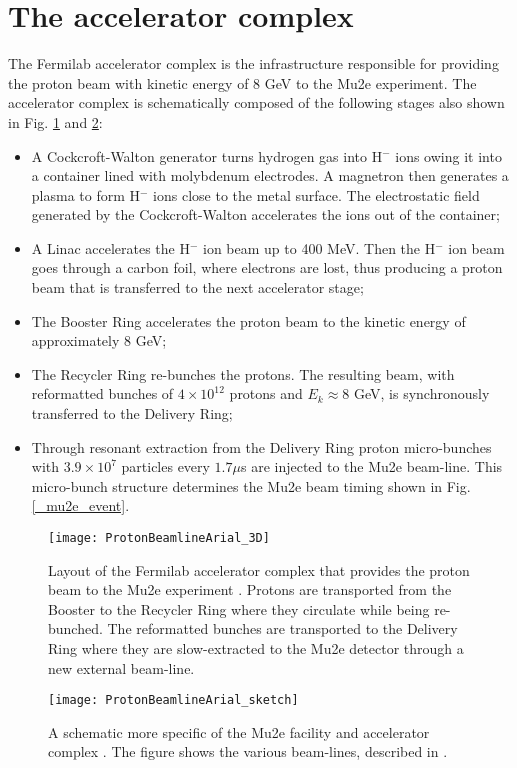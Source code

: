 \documentclass[12pt,a4paper,openright, oneside, titlepage]{book} %
\begin{document}
\section{The accelerator complex}
The Fermilab accelerator complex is the infrastructure responsible for providing the proton beam with kinetic energy of 8 GeV to the Mu2e experiment.
The accelerator complex is schematically composed of the following stages also shown in Fig. \ref{_ProtonBeamlineArial} and \ref{_ProtonBeamlineArial_sketch}:
\begin{itemize}
\item A Cockcroft-Walton generator turns hydrogen gas
into H$^-$ ions owing it into a container lined with molybdenum electrodes. 
A magnetron then generates a plasma to form H$^-$ ions close to the metal surface. 
The electrostatic field generated by the Cockcroft-Walton accelerates the ions out of the container;
\item A Linac accelerates the H$^-$ ion beam up to 400 MeV. 
Then the H$^-$  ion beam goes through a carbon foil, 
where electrons are lost, thus producing a proton beam that is transferred to the next accelerator stage;
\item The Booster Ring accelerates the proton beam to the kinetic energy of approximately 8 GeV;
\item The Recycler Ring re-bunches the protons. 
The resulting beam, with reformatted bunches of $4\times10^{12}$ protons and $E_k\approx8$ GeV,
is synchronously transferred to the Delivery Ring;
\item Through resonant extraction from the Delivery Ring proton micro-bunches
with $3.9\times10^7$ particles every $1.7 \mu$s are injected to the Mu2e beam-line. 
This  micro-bunch structure determines the Mu2e beam timing shown in Fig.  \ref{_mu2e_event}. 
\end{itemize}

\begin{figure}[h!]
\centering
\texttt{[image: ProtonBeamlineArial\_3D]}
\caption{Layout of the Fermilab accelerator complex that provides the proton beam to the Mu2e experiment \cite{FNAL}. 
Protons are transported from the Booster to the Recycler Ring where they circulate while being re-bunched. 
The reformatted bunches are transported to the Delivery Ring where they are slow-extracted to the Mu2e detector through a new external beam-line.}
\label{_ProtonBeamlineArial}
\end{figure}

\begin{figure}[h!]
\centering
\texttt{[image: ProtonBeamlineArial\_sketch]}
\caption{A schematic more specific of the Mu2e facility and accelerator complex \cite{MTDR}. The figure shows the various beam-lines, described in \cite{MTDR}.}
\label{_ProtonBeamlineArial_sketch}
\end{figure}
\end{document}
